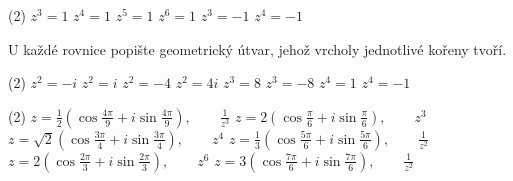 \documentclass[12pt,a4paper]{article}
\begin{document}
\begin{exercise}
        \begin{tasks}(2)
            \task $z^3=1$
            \task $z^4=1$
            \task $z^5=1$
            \task $z^6=1$
            \task $z^3=-1$
            \task $z^4=-1$
        \end{tasks}

        U každé rovnice popište geometrický útvar, jehož vrcholy jednotlivé kořeny tvoří.
\end{exercise}


\begin{exercise}
        \begin{tasks}(2)
            \task $z^2=-i$
            \task $z^2=i$
            \task $z^2=-4$
            \task $z^2=4i$
            \task $z^3=8$
            \task $z^3=-8$
            \task $z^4=1$
            \task $z^4=-1$
        \end{tasks}
\end{exercise}


\begin{exercise}
    \begin{tasks}(2)
        \task $\displaystyle
            z=\frac12\left(
                \cos\frac{4\pi}{9}
                +i\sin\frac{4\pi}{9}
            \right),
            \qquad
            \frac1{z^3}$
        \task $\displaystyle
            z=2\left(
                \cos\frac{\pi}{6}
                +i\sin\frac{\pi}{6}
            \right),
            \qquad
            z^3$
        \task $\displaystyle
            z=\sqrt2\left(
                \cos\frac{3\pi}{4}
                +i\sin\frac{3\pi}{4}
            \right),
            \qquad
            z^4$
        \task $\displaystyle
            z=\frac13\left(
                \cos\frac{5\pi}{6}
                +i\sin\frac{5\pi}{6}
            \right),
            \qquad
            \frac1{z^2}$
        \task $\displaystyle
            z=2\left(
                \cos\frac{2\pi}{3}
                +i\sin\frac{2\pi}{3}
            \right),
            \qquad
            z^6$
        \task $\displaystyle
            z=3\left(
                \cos\frac{7\pi}{6}
                +i\sin\frac{7\pi}{6}
            \right),
            \qquad
            \frac1{z^2}$
    \end{tasks}
\end{exercise}
\end{document}

